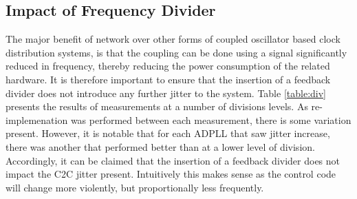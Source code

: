 \subsection{Impact of Frequency Divider}
The major benefit of  network over other forms of coupled oscillator based clock distribution systems, is that the coupling can be done using a signal significantly reduced in frequency, thereby reducing the power consumption of the related hardware. It is therefore important to ensure that the insertion of a feedback divider does not introduce any further jitter to the system. Table \ref{table:div} presents the results of measurements at a number of divisions levels. As re-implemenation was performed between each measurement, there is some variation present. However, it is notable that for each \ac{ADPLL} that saw  jitter increase, there was another that performed better than at a lower level of division. Accordingly, it can be claimed that the insertion of a feedback divider does not impact the \ac{C2C} jitter present. Intuitively this makes sense as the control code will change more violently, but proportionally less frequently. 
